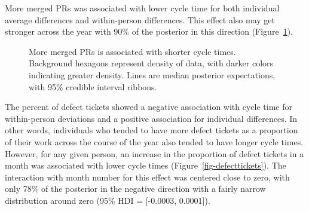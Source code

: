 \documentclass[
  sn-mathphys-ay,
]{sn-jnl}
\begin{document}
More merged PRs was associated with lower cycle time for both individual
average differences and within-person differences. This effect also may
get stronger across the year with 90\% of the posterior in this
direction (Figure~\ref{fig-mergedprs}).

\begin{figure}


\caption[More merged PRs is associated with shorter cycle
times]{\label{fig-mergedprs}More merged PRs is associated with shorter
cycle times. Background hexagons represent density of data, with darker
colors indicating greater density. Lines are median posterior
expectations, with 95\% credible interval ribbons.}

\end{figure}%

The percent of defect tickets showed a negative association with cycle
time for within-person deviations and a positive association for
individual differences. In other words, individuals who tended to have
more defect tickets as a proportion of their work across the course of
the year also tended to have longer cycle times. However, for any given
person, an increase in the proportion of defect tickets in a month was
associated with lower cycle times (Figure~\ref{fig-defecttickets}). The
interaction with month number for this effect was centered close to
zero, with only 78\% of the posterior in the negative direction with a
fairly narrow distribution around zero (95\% HDI = {[}-0.0003,
0.0001{]}).
\end{document}

